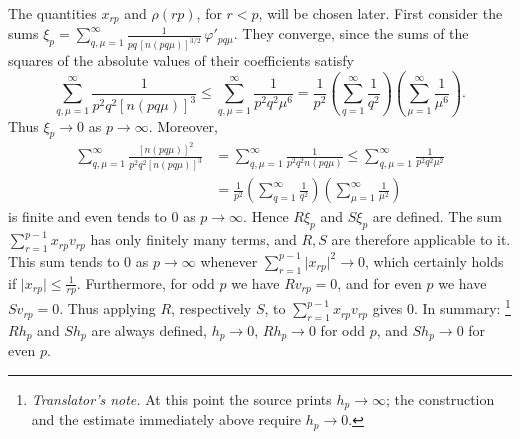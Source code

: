 \documentclass[
  paper=b5,
  twoside=true,
  fontsize=13pt,
  headings=normal,
  bookmarkpackage=false
]{scrartcl}
\theoremstyle{definition}
\newcounter{translatornote}
\newcounter{savedfootnote}
\newcommand{\TranslatorNote}[1]{%
  \stepcounter{translatornote}%
  \setcounter{savedfootnote}{\value{footnote}}%
  \begingroup
    \renewcommand{\thefootnote}{T\arabic{translatornote}}%
    \footnote{\textit{Translator's note.} #1}%
  \endgroup
  \setcounter{footnote}{\value{savedfootnote}}}
\begin{document}
The quantities \(x_{rp}\) and \(\rho(rp)\), for \(r<p\), will be chosen
later. First consider the sums
\(\xi_p=\sum_{q,\mu=1}^{\infty}
\frac{1}{pq\,[n(pq\mu)]^{3/2}}\,\varphi'_{pq\mu}\).
They converge, since the sums of the squares of the absolute values of
their coefficients satisfy
\[
  \sum_{q,\mu=1}^{\infty}
  \frac{1}{p^{2}q^{2}[n(pq\mu)]^{3}}
  \leq
  \sum_{q,\mu=1}^{\infty}
  \frac{1}{p^{2}q^{2}\mu^{6}}
  =
  \frac{1}{p^{2}}
  \left(\sum_{q=1}^{\infty}\frac1{q^{2}}\right)
  \left(\sum_{\mu=1}^{\infty}\frac1{\mu^{6}}\right).
\]
Thus \(\xi_p\to0\) as \(p\to\infty\). Moreover,
\begin{align*}
  \sum_{q,\mu=1}^{\infty}
  \frac{[n(pq\mu)]^{2}}{p^{2}q^{2}[n(pq\mu)]^{3}}
  &=
  \sum_{q,\mu=1}^{\infty}
  \frac{1}{p^{2}q^{2}n(pq\mu)}
  \leq
  \sum_{q,\mu=1}^{\infty}
  \frac{1}{p^{2}q^{2}\mu^{2}}\\
  &=
  \frac{1}{p^{2}}
  \left(\sum_{q=1}^{\infty}\frac1{q^{2}}\right)
  \left(\sum_{\mu=1}^{\infty}\frac1{\mu^{2}}\right)
\end{align*}
is finite and even tends to \(0\) as \(p\to\infty\). Hence
\(R\xi_p\) and \(S\xi_p\) are defined. The sum
\(\sum_{r=1}^{p-1}x_{rp}v_{rp}\) has only finitely many terms, and
\(R,S\) are therefore applicable to it. This sum tends to \(0\) as
\(p\to\infty\) whenever \(\sum_{r=1}^{p-1}\lvert x_{rp}\rvert^{2}
\longrightarrow0\), which certainly holds if \(\lvert x_{rp}\rvert
\leq\frac1{rp}\). Furthermore, for odd \(p\) we have \(Rv_{rp}=0\), and for even \(p\) we
have \(Sv_{rp}=0\).  Thus applying \(R\), respectively \(S\), to
\(\sum_{r=1}^{p-1}x_{rp}v_{rp}\) gives \(0\).  In
summary:\TranslatorNote{At this point the source prints \(h_p\to\infty\);
the construction and the estimate immediately above require \(h_p\to0\).}
\(Rh_p\) and \(Sh_p\) are always defined, \(h_p\to0\), \(Rh_p\to0\)
for odd \(p\), and \(Sh_p\to0\) for even \(p\).
\end{document}
